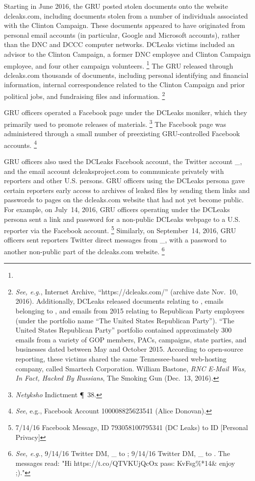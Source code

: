 Starting in June 2016, the GRU posted stolen documents onto the website dcleaks.com, including documents stolen from a number of individuals associated with the Clinton Campaign.
These documents appeared to have originated from personal email accounts (in particular, Google and Microsoft accounts), rather than the DNC and DCCC computer networks.
DCLeaks victims included an advisor to the Clinton Campaign, a former DNC employee and Clinton Campaign employee, and four other campaign volunteers.%
\footnote{}
The GRU released through dcleaks.com thousands of documents, including personal identifying and financial information, internal correspondence related to the Clinton Campaign and prior political jobs, and fundraising files and information.%
\footnote{\textit{See, e.g.}, Internet Archive, ``https://dcleaks.com/'' (archive date Nov.~10, 2016).
Additionally, DCLeaks released documents relating to , emails belonging to , and emails from 2015 relating to Republican Party employees (under the portfolio name ``The United States Republican Party'').
``The United States Republican Party'' portfolio contained approximately 300 emails from a variety of GOP members, PACs, campaigns, state parties, and businesses dated between May and October 2015.
According to open-source reporting, these victims shared the same Tennessee-based web-hosting company, called Smartech Corporation.
William Bastone, \textit{RNC E-Mail Was, In Fact, Hacked By Russians}, The Smoking Gun (Dec.~13, 2016).}

GRU officers operated a Facebook page under the DCLeaks moniker, which they primarily used to promote releases of materials.%
\footnote{\textit{Netyksho} Indictment \P~38.}
The Facebook page was administered through a small number of preexisting GRU-controlled Facebook accounts.%
\footnote{\textit{See}, e.g., Facebook Account 100008825623541 (Alice Donovan).}

GRU officers also used the DCLeaks Facebook account, the Twitter account \@dcleaks\_, and the email account dcleaksproject\@gmail.com to communicate privately with reporters and other U.S. persons.
GRU officers using the DCLeaks persona gave certain reporters early access to archives of leaked files by sending them links and passwords to pages on the dcleaks.com website that had not yet become public.
For example, on July~14, 2016, GRU officers operating under the DCLeaks persona sent a link and password for a non-public DCLeaks webpage to a U.S. reporter via the Facebook account.%
\footnote{7/14/16 Facebook Message, ID 793058100795341 (DC Leaks) to ID [Personal Privacy]}
Similarly, on September~14, 2016, GRU officers sent reporters Twitter direct messages from \@dcleaks\_, with a password to another non-public part of the dcleaks.com website.%
\footnote{\textit{See, e.g.}, 9/14/16 Twitter DM, \@dcleaks\_ to ;
9/14/16 Twitter DM, \@dcleaks\_ to .
The messages read: "Hi https://t.co/QTVKUjQcOx pass: KvFsg\%*14\@gPgu\& enjoy ;)."}

